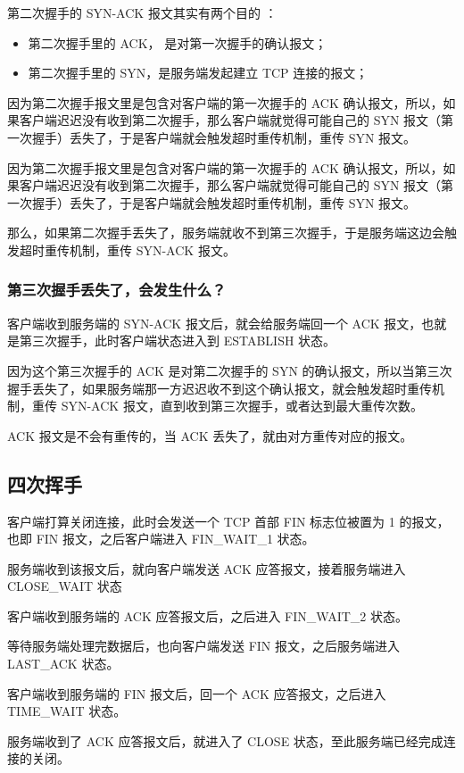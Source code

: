 \documentclass[11pt]{article}
\begin{document}
第二次握手的 SYN-ACK 报文其实有两个目的 ：
\begin{itemize}
\item 第二次握手里的 ACK， 是对第一次握手的确认报文；
\item 第二次握手里的 SYN，是服务端发起建立 TCP 连接的报文；
\end{itemize}

因为第二次握手报文里是包含对客户端的第一次握手的 ACK 确认报文，所以，如果客户端迟迟没有收到第二次握手，那么客户端就觉得可能自己的 SYN 报文（第一次握手）丢失了，于是客户端就会触发超时重传机制，重传 SYN 报文。

因为第二次握手报文里是包含对客户端的第一次握手的 ACK 确认报文，所以，如果客户端迟迟没有收到第二次握手，那么客户端就觉得可能自己的 SYN 报文（第一次握手）丢失了，于是客户端就会触发超时重传机制，重传 SYN 报文。

那么，如果第二次握手丢失了，服务端就收不到第三次握手，于是服务端这边会触发超时重传机制，重传 SYN-ACK 报文。
\subsubsection{第三次握手丢失了，会发生什么？}
\label{sec:org3d5eb0b}
客户端收到服务端的 SYN-ACK 报文后，就会给服务端回一个 ACK 报文，也就是第三次握手，此时客户端状态进入到 ESTABLISH 状态。

因为这个第三次握手的 ACK 是对第二次握手的 SYN 的确认报文，所以当第三次握手丢失了，如果服务端那一方迟迟收不到这个确认报文，就会触发超时重传机制，重传 SYN-ACK 报文，直到收到第三次握手，或者达到最大重传次数。

ACK 报文是不会有重传的，当 ACK 丢失了，就由对方重传对应的报文。
\subsection{四次挥手}
\label{sec:org82efcc6}
客户端打算关闭连接，此时会发送一个 TCP 首部 FIN 标志位被置为 1 的报文，也即 FIN 报文，之后客户端进入 FIN\_WAIT\_1 状态。

服务端收到该报文后，就向客户端发送 ACK 应答报文，接着服务端进入 CLOSE\_WAIT 状态

客户端收到服务端的 ACK 应答报文后，之后进入 FIN\_WAIT\_2 状态。

等待服务端处理完数据后，也向客户端发送 FIN 报文，之后服务端进入 LAST\_ACK 状态。

客户端收到服务端的 FIN 报文后，回一个 ACK 应答报文，之后进入 TIME\_WAIT 状态。

服务端收到了 ACK 应答报文后，就进入了 CLOSE 状态，至此服务端已经完成连接的关闭。
\end{document}
